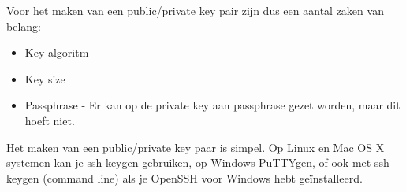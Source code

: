 Voor het maken van een public/private key pair zijn dus een aantal zaken van belang:
\begin{itemize}
	\item Key algoritm
	\item Key size
	\item Passphrase - Er kan op de private key aan passphrase gezet worden, maar dit hoeft niet.
\end{itemize}

Het maken van een public/private key paar is simpel. Op Linux en Mac OS X systemen kan je ssh-keygen gebruiken, op Windows PuTTYgen, of ook met ssh-keygen (command line) als je OpenSSH voor Windows hebt ge\"installeerd.
